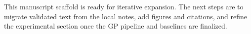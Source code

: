 This manuscript scaffold is ready for iterative expansion. The next steps
are to migrate validated text from the local notes, add figures and
citations, and refine the experimental section once the GP pipeline and
baselines are finalized.
